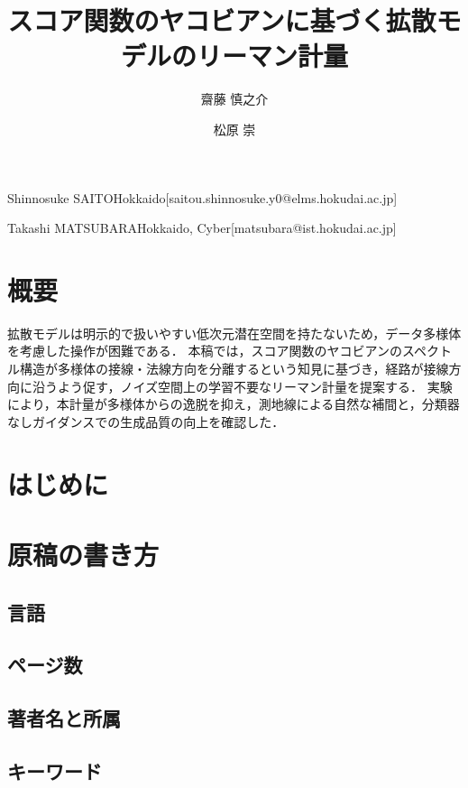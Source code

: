 \documentclass[MIRU,submit]{miru2026j}
\begin{document}
\title{スコア関数のヤコビアンに基づく拡散モデルのリーマン計量}


\author{齋藤 慎之介}{Shinnosuke SAITO}{Hokkaido}[saitou.shinnosuke.y0@elms.hokudai.ac.jp]
\author{松原 崇}{Takashi MATSUBARA}{Hokkaido, Cyber}[matsubara@ist.hokudai.ac.jp]

\maketitle

\section*{概要}
拡散モデルは明示的で扱いやすい低次元潜在空間を持たないため，データ多様体を考慮した操作が困難である．
本稿では，スコア関数のヤコビアンのスペクトル構造が多様体の接線・法線方向を分離するという知見に基づき，経路が接線方向に沿うよう促す，ノイズ空間上の学習不要なリーマン計量を提案する．
実験により，本計量が多様体からの逸脱を抑え，測地線による自然な補間と，分類器なしガイダンスでの生成品質の向上を確認した．

\section{はじめに}

\section{原稿の書き方}

\subsection{言語}

\subsection{ページ数}

\subsection{著者名と所属}

\subsection{キーワード}
\end{document}
